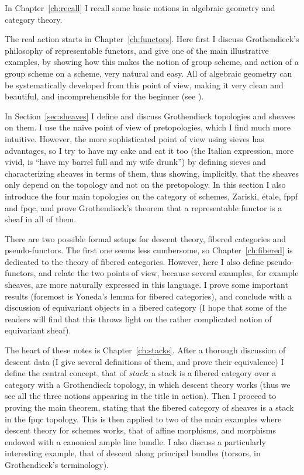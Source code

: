\begin{0   INTRODUCTION}
In Chapter~\ref{ch:recall} I recall some basic notions in algebraic geometry and category theory.

The real action starts in Chapter~\ref{ch:functors}. Here first I discuss Grothendieck's philosophy of representable functors, and give one of the main illustrative examples, by showing how this makes the notion of group scheme, and action of a group scheme on a scheme, very natural and easy. All of algebraic geometry can be systematically developed from this point of view, making it very clean and beautiful, and incomprehensible for the beginner (see \cite{demazure-gabriel}).

In Section~\ref{sec:sheaves} I define and discuss Grothendieck topologies and sheaves on them. I use the naive point of view of pretopologies, which I find much more intuitive. However, the more sophisticated point of view using sieves has advantages, so I try to have my cake and eat it too (the Italian expression, more vivid, is ``have my barrel full and my wife drunk'') by defining sieves and characterizing sheaves in terms of them, thus showing, implicitly, that the sheaves only depend on the topology and not on the pretopology. In this section I also introduce the four main topologies on the category of schemes, Zariski, \'etale, fppf and fpqc, and prove Grothendieck's theorem that a representable functor is a sheaf in all of them.

There are two possible formal setups for descent theory, fibered categories and pseudo-functors. The first one seems less cumbersome, so Chapter~\ref{ch:fibered} is dedicated to the theory of fibered categories. However, here I also define pseudo-functors, and relate the two points of view, because several examples, for example \qc sheaves, are more naturally expressed in this language. I prove some important results (foremost is Yoneda's lemma for fibered categories), and conclude with a discussion of equivariant objects in a fibered category (I hope that some of the readers will find that this throws light on the rather complicated notion of equivariant sheaf).

The heart of these notes is Chapter~\ref{ch:stacks}. After a thorough discussion of descent data (I give several definitions of them, and prove their equivalence) I define the central concept, that of \emph{stack}: a stack is a fibered category over a category with a Grothendieck topology, in which descent theory works (thus we see all the three notions appearing in the title in action). Then I proceed to proving the main theorem, stating that the fibered category of \qc sheaves is a stack in the fpqc topology. This is then applied to two of the main examples where descent theory for schemes works, that of affine morphisms, and morphisms endowed with a canonical ample line bundle. I also discuss a particularly interesting example, that of descent along principal bundles (torsors, in Grothendieck's terminology).


\end{0   INTRODUCTION}
